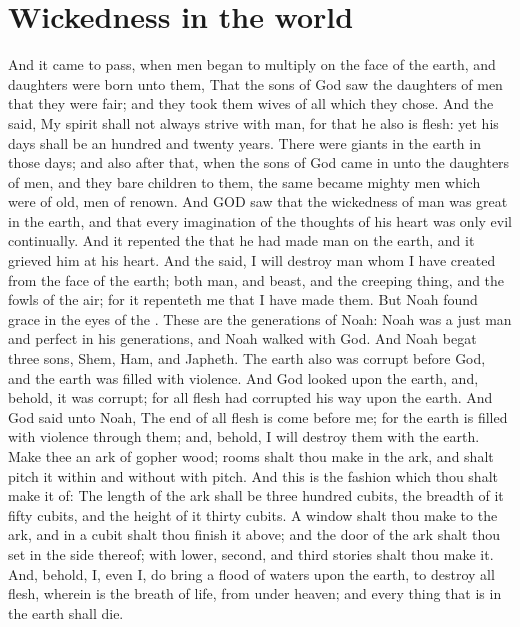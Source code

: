 \section*{Wickedness in the world}
\begin{biblechapter} %
\verse And it came to pass, when men began to multiply on the face of the earth, and daughters were born unto them,
\verse That the sons of God saw the daughters of men that they were fair; and they took them wives of all which they chose.
\verse And the \LORD said, My spirit shall not always strive with man, for that he also is flesh: yet his days shall be an hundred and twenty years.
\verse There were giants in the earth in those days; and also after that, when the sons of God came in unto the daughters of men, and they bare children to them, the same became mighty men which were of old, men of renown.
\verse And GOD saw that the wickedness of man was great in the earth, and that every imagination of the thoughts of his heart was only evil continually.
\verse And it repented the \LORD that he had made man on the earth, and it grieved him at his heart.
\verse And the \LORD said, I will destroy man whom I have created from the face of the earth; both man, and beast, and the creeping thing, and the fowls of the air; for it repenteth me that I have made them.
\verse But Noah found grace in the eyes of the \LORD.
\verse These are the generations of Noah: Noah was a just man and perfect in his generations, and Noah walked with God.
\verse And Noah begat three sons, Shem, Ham, and Japheth.
\verse The earth also was corrupt before God, and the earth was filled with violence.
\verse And God looked upon the earth, and, behold, it was corrupt; for all flesh had corrupted his way upon the earth.
\verse And God said unto Noah, The end of all flesh is come before me; for the earth is filled with violence through them; and, behold, I will destroy them with the earth.
\verse Make thee an ark of gopher wood; rooms shalt thou make in the ark, and shalt pitch it within and without with pitch.
\verse And this is the fashion which thou shalt make it of: The length of the ark shall be three hundred cubits, the breadth of it fifty cubits, and the height of it thirty cubits.
\verse A window shalt thou make to the ark, and in a cubit shalt thou finish it above; and the door of the ark shalt thou set in the side thereof; with lower, second, and third stories shalt thou make it.
\verse And, behold, I, even I, do bring a flood of waters upon the earth, to destroy all flesh, wherein is the breath of life, from under heaven; and every thing that is in the earth shall die.

\end{biblechapter}
